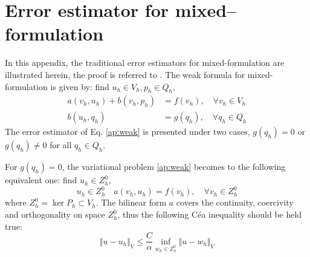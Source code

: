 \section{Error estimator for mixed--formulation}
In this appendix, the traditional error estimators for mixed-formulation are illustrated herein, the proof is referred to \cite{brenner2008}. The weak formula for mixed-formulation is given by:
find $u_h \in V_h, p_h \in Q_h$,
\begin{equation}\label{ap:weak}
\begin{split}
    a(v_h,u_h) + b(v_h,p_h) &= f(v_h), \quad \forall v_h \in V_h \\
    b(u_h,q_h) &= g(q_h), \quad \forall q_h \in Q_h
\end{split}
\end{equation}
The error estimator of Eq. \eqref{ap:weak} is presented under two cases, $g(q_h)=0$ or $g(q_h) \ne 0$ for all $q_h \in Q_h$.

For $g(q_h)=0$, the variational problem \eqref{ap:weak} becomes to the following equivalent one: find $u_h \in Z^0_h$,
\begin{equation}
u_h \in Z^0_h \quad a(v_h,u_h) = f(v_h), \quad \forall v_h \in Z^0_h
\end{equation}
where $Z^0_h = \ker P_h \subset V_h$. The bilinear form $a$ covers the continuity, coercivity and orthogonality on space $Z^0_h$, thus the following Céa inequality \cite{brenner2008} should be held true:
\begin{equation}\label{ap:cea}
\Vert u-u_h \Vert_V \le \frac{C}{\alpha} \inf_{w_h \in Z^0_h}\Vert u-w_h \Vert_V
\end{equation}

